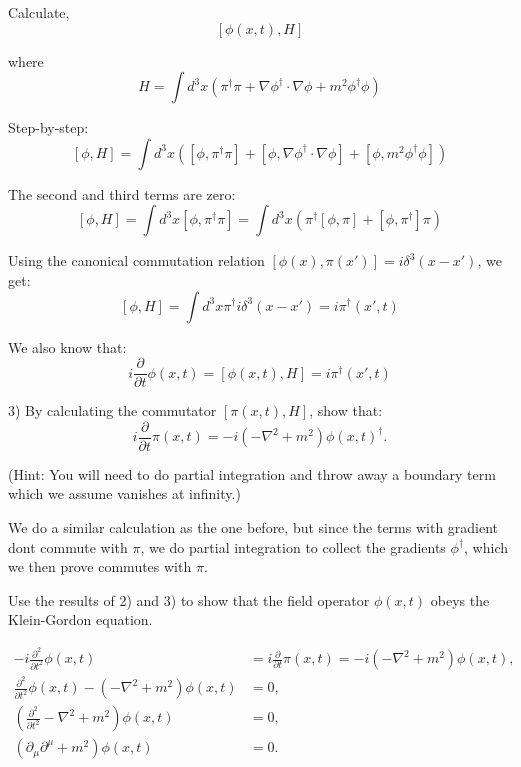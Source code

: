 \documentclass[working, oneside]{../../Preambles/tuftebook}
\begin{document}
\begin{solution}
Calculate,
\[
[\phi(x, t), H]
\]

where
\[
H = \int d^3x \left( \pi^\dagger \pi + \nabla \phi^\dagger \cdot \nabla \phi + m^2 \phi^\dagger \phi \right)
\]

Step-by-step:
\[
[\phi, H] = \int d^3x \left( [\phi, \pi^\dagger \pi] + [\phi, \nabla \phi^\dagger \cdot \nabla \phi] + [\phi, m^2 \phi^\dagger \phi] \right)
\]

The second and third terms are zero:
\[
[\phi, H] = \int d^3x [\phi, \pi^\dagger \pi] = \int d^3x \left( \pi^\dagger [\phi, \pi] + [\phi, \pi^\dagger] \pi \right)
\]

Using the canonical commutation relation \( [\phi(x), \pi(x')] = i \delta^3(x - x') \), we get:
\[
[\phi, H] = \int d^3x \pi^\dagger i \delta^3(x - x') = i \pi^\dagger(x', t)
\]

We also know that:
\[
i \frac{\partial}{\partial t} \phi(x, t) = [\phi(x, t), H] = i \pi^\dagger(x', t)
\]
\end{solution}
\begin{exercise}[3.3]
3) By calculating the commutator \( [\pi(x, t), H] \), show that:
\[
i \frac{\partial}{\partial t} \pi(x, t) = -i \left( -\nabla^2 + m^2 \right) \phi(x, t)^\dagger. \tag{34}
\]

(Hint: You will need to do partial integration and throw away a boundary term 
which we assume vanishes at infinity.)
\end{exercise}
\begin{solution}
We do a similar calculation as the one before, but since the terms with gradient dont commute with $\pi$, we do partial integration to collect the gradients $\phi ^\dagger$, which we then prove commutes with $\pi$.
\end{solution}
\begin{exercise}[3.4]
Use the results of 2) and 3) to show that the field operator $\phi(x,t)$ obeys the Klein-Gordon equation.
\end{exercise}
\begin{solution}
\begin{align*}
-i\frac{\partial^2}{\partial t^2} \phi(x,t) &= i \frac{\partial}{\partial t} \pi(x,t) = -i(-\nabla^2 + m^2)\phi(x,t), \\
\frac{\partial^2}{\partial t^2} \phi(x,t) - (-\nabla^2 + m^2)\phi(x,t) &= 0, \\
\left( \frac{\partial^2}{\partial t^2} - \nabla^2 + m^2 \right)\phi(x,t) &= 0, \\
\left( \partial_\mu \partial^\mu + m^2 \right)\phi(x,t) &= 0.
\end{align*}
\end{solution}
\end{document}
